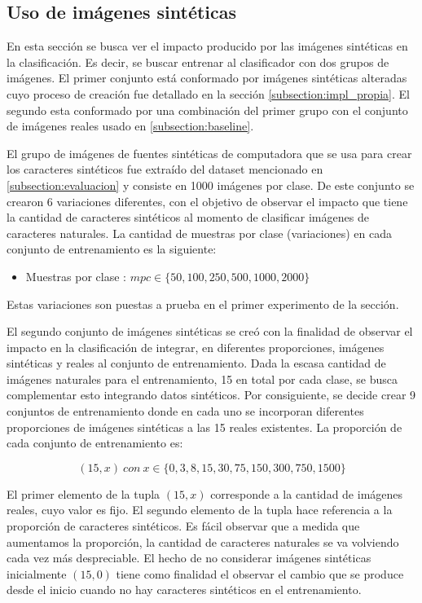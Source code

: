 \subsection{Uso de imágenes sintéticas}

	En esta sección se busca ver el impacto producido por las imágenes sintéticas en la clasificación. Es decir, se buscar entrenar al clasificador con dos grupos de imágenes. El primer conjunto está conformado por imágenes sintéticas alteradas cuyo proceso de creación fue detallado en la sección \ref{subsection:impl_propia}. El segundo esta conformado por una combinación del primer grupo con el conjunto de imágenes reales usado en \ref{subsection:baseline}.
	
	El grupo de imágenes de fuentes sintéticas de computadora que se usa para crear los caracteres sintéticos fue extraído del dataset mencionado en \ref{subsection:evaluacion} y consiste en 1000 imágenes por clase. De este conjunto se crearon 6 variaciones diferentes, con el objetivo de observar el impacto que tiene la cantidad de caracteres sintéticos al momento de clasificar imágenes de caracteres naturales. La cantidad de muestras por clase (variaciones) en cada conjunto de entrenamiento es la siguiente:
	\begin{itemize}
		\item Muestras por clase : $ mpc \in \{ 50,100,250,500,1000,2000\}$
	\end{itemize}
	
	Estas variaciones son puestas a prueba en el primer experimento de la sección.
	
	El segundo conjunto de imágenes sintéticas se creó con la finalidad de observar el impacto en la clasificación de integrar, en diferentes proporciones, imágenes sintéticas y reales al conjunto de entrenamiento. Dada la escasa cantidad de imágenes naturales para el entrenamiento, 15 en total por cada clase, se busca complementar esto integrando datos sintéticos. Por consiguiente, se decide crear 9 conjuntos de entrenamiento donde en cada uno se incorporan diferentes proporciones de imágenes sintéticas a las 15 reales existentes. La proporción de cada conjunto de entrenamiento es: 
	
	$$(15, x)~\textit{con}~ x \in \{0,3,8,15,30,75,150,300,750,1500 \}$$
	
	El primer elemento de la tupla $(15, x)$ corresponde a la cantidad de imágenes reales, cuyo valor es fijo. El segundo elemento de la tupla hace referencia a la proporción de caracteres sintéticos. Es fácil observar que a medida que aumentamos la proporción, la cantidad de caracteres naturales se va volviendo cada vez más despreciable. El hecho de no considerar imágenes sintéticas inicialmente $(15,0)$ tiene como finalidad el observar el cambio que se produce desde el inicio cuando no hay caracteres sintéticos en el entrenamiento.
	
